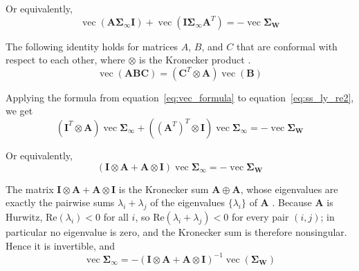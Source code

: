 \documentclass{article}
\begin{document}
Or equivalently,
\begin{equation}
\operatorname{vec}(\mathbf{A} \mathbf{\Sigma}_\mathbf{\infty} \mathbf{I})+\operatorname{vec}(\mathbf{I} \mathbf{\Sigma}_\mathbf{\infty} \mathbf{A}^T)=
-\operatorname{vec} \mathbf{\Sigma}_\mathbf{W}
\label{eq:ss_ly_re2}
\end{equation}


The following identity holds for matrices $A $, $B $, and $C $ that are conformal with respect to each other, where $\otimes$ is the Kronecker product \citep{MagnusNeudecker1999}.
\begin{equation}
\operatorname{vec}(\mathbf{ABC})=(\mathbf{C}^T \otimes \mathbf{A} )\operatorname{vec}(\mathbf{B})
\label{eq:vec_formula}
\end{equation}


Applying the formula from equation~\ref{eq:vec_formula} to equation~\ref{eq:ss_ly_re2}, we get
\begin{equation}
(\mathbf{I}^T \otimes \mathbf{A}) \operatorname{vec} \mathbf{\Sigma}_\mathbf{\infty} + \left ((\mathbf{A}^T)^T \otimes \mathbf{I} \right) \operatorname{vec} \mathbf{\Sigma}_\mathbf{\infty} = -\operatorname{vec} \mathbf{\Sigma}_\mathbf{W}
\end{equation}


Or equivalently,
\begin{equation}
(\mathbf{I} \otimes \mathbf{A} + \mathbf{A} \otimes \mathbf{I}) \operatorname{vec} \mathbf{\Sigma}_\mathbf{\infty} = -\operatorname{vec} \mathbf{\Sigma}_\mathbf{W}
\end{equation}


The matrix $\mathbf{I} \otimes \mathbf{A} + \mathbf{A} \otimes \mathbf{I}$ is the Kronecker sum $\mathbf{A} \oplus \mathbf{A}$, whose eigenvalues are exactly the pairwise sums $\lambda_i + \lambda_j$ of the eigenvalues $\{\lambda_i\}$ of $\mathbf{A}$ \citep[Theorem~4.4.5]{HornJohnson1991}. Because $\mathbf{A}$ is Hurwitz, $\mathrm{Re}(\lambda_i) < 0$ for all $i$, so $\mathrm{Re}(\lambda_i + \lambda_j) < 0$ for every pair $(i,j)$; in particular no eigenvalue is zero, and the Kronecker sum is therefore nonsingular. Hence it is invertible, and
\begin{equation}
\operatorname{vec} \mathbf{\Sigma}_\mathbf{\infty} =
-{(\mathbf{I} \otimes \mathbf{A} + \mathbf{A} \otimes \mathbf{I})}^{-1} \operatorname{vec}(\mathbf{\Sigma}_\mathbf{W})
\label{eq:sigma_infty_vec}
\end{equation}
\end{document}
